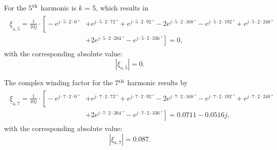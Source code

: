 \begin{solutionblock}
    For the $5\textsuperscript{th}$ harmonic is $k$ = 5, which results in
    \begin{align}
        \begin{split}
            \underline{\xi}_{\mathrm{a,}5} = \frac{1}{10j}\cdot \left[ \right. -e^{j\cdot5\cdot2\cdot\SI{0}{\degree}}
            &+e^{j\cdot5\cdot2\cdot\SI{72}{\degree}}+e^{j\cdot5\cdot2\cdot\SI{92}{\degree}}-2e^{j\cdot5\cdot2\cdot\SI{168}{\degree}}-e^{j\cdot5\cdot2\cdot\SI{192}{\degree}}
            +e^{j\cdot5\cdot2\cdot\SI{240}{\degree}} \\
            & +2e^{j\cdot5\cdot2\cdot\SI{264}{\degree}}-e^{j\cdot5\cdot2\cdot\SI{336}{\degree}}
            \left. \right]
            = 0,
        \end{split}
    \end{align}
    with the corresponding absolute value:
    \begin{equation}
        |\xi_{\mathrm{a,}5}| = 0.
    \end{equation}

    The complex winding factor for the $7\textsuperscript{th}$ harmonic results by
    \begin{align}
        \begin{split}
            \underline{\xi}_{\mathrm{a,}7} = \frac{1}{10j}\cdot \left[ \right. -e^{j\cdot7\cdot2\cdot\SI{0}{\degree}}
            &+e^{j\cdot7\cdot2\cdot\SI{72}{\degree}}+e^{j\cdot7\cdot2\cdot\SI{92}{\degree}}-2e^{j\cdot7\cdot2\cdot\SI{168}{\degree}}-e^{j\cdot7\cdot2\cdot\SI{192}{\degree}}
            +e^{j\cdot7\cdot2\cdot\SI{240}{\degree}} \\
            & +2e^{j\cdot7\cdot2\cdot\SI{264}{\degree}}-e^{j\cdot7\cdot2\cdot\SI{336}{\degree}}
            \left. \right]
            = 0.0711 - 0.0516j,
        \end{split}
    \end{align}
    with the corresponding absolute value:
    \begin{equation}
        |\xi_{\mathrm{a,}7}| = 0.087.
    \end{equation}


\end{solutionblock}



